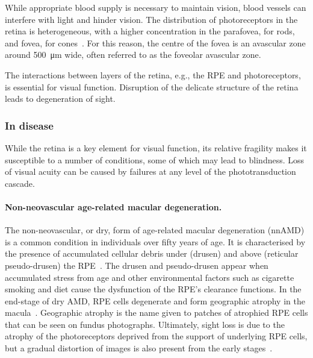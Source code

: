 \documentclass{article}
\begin{document}
While appropriate blood supply is necessary to maintain vision, blood vessels can interfere with light and hinder vision.
The distribution of photoreceptors in the retina is heterogeneous, with a higher concentration in the parafovea, for rods, and fovea, for cones~\cite{Zouache_2022}.
For this reason, the centre of the fovea is an avascular zone around \SI{500}{\micro\meter} wide, often referred to as the foveolar avascular zone.

The interactions between layers of the retina, e.g., the RPE and photoreceptors, is essential for visual function.
Disruption of the delicate structure of the retina leads to degeneration of sight.

\subsubsection{In disease}

While the retina is a key element for visual function, its relative fragility makes it susceptible to a number of conditions, some of which may lead to blindness.
Loss of visual acuity can be caused by failures at any level of the phototransduction cascade.\\

\paragraph*{Non-neovascular age-related macular degeneration.}
The non-neovascular, or dry, form of age-related macular degeneration (nnAMD) is a common condition in individuals over fifty years of age.
It is characterised by the presence of accumulated cellular debris under (drusen) and above (reticular pseudo-drusen) the RPE~\cite{Bottos_2012}.
The drusen and pseudo-drusen appear when accumulated stress from age and other environmental factors such as cigarette smoking and diet cause the dysfunction of the RPE's clearance functions.
In the end-stage of dry AMD, RPE cells degenerate and form geographic atrophy in the macula~\cite{Jager_2008}.
Geographic atrophy is the name given to patches of atrophied RPE cells that can be seen on fundus photographs.
Ultimately, sight loss is due to the atrophy of the photoreceptors deprived from the support of underlying RPE cells, but a gradual distortion of images is also present from the early stages~\cite{Newsom_2008,Zacks_2022}.\\
\end{document}
